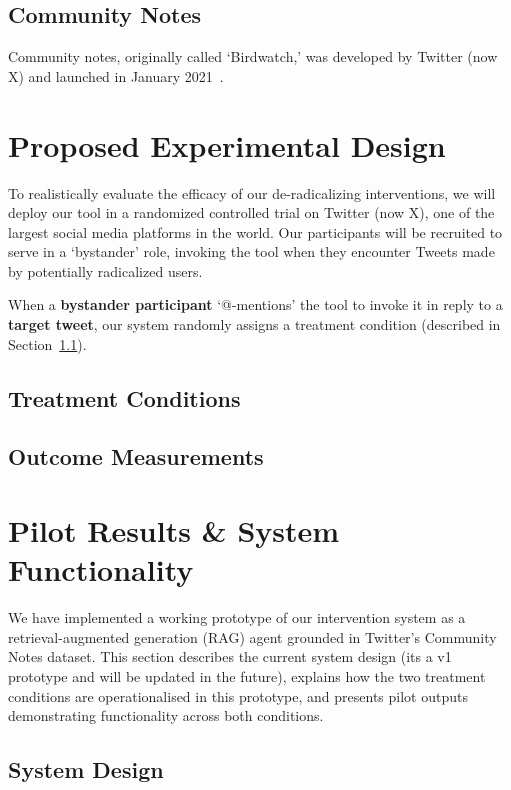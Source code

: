 \documentclass{article}
\begin{document}
\subsection{Community Notes}\label{sec:comm_notes}
Community notes, originally called `Birdwatch,' was developed by Twitter (now X) and launched in January 2021~\cite{Wojcik2022BirdwatchCW}.

\section{Proposed Experimental Design}\label{sec:design}
To realistically evaluate the efficacy of our de-radicalizing interventions, we will deploy our tool in a randomized controlled trial on Twitter (now X), one of the largest social media platforms in the world. Our participants will be recruited to serve in a `bystander' role, invoking the tool when they encounter Tweets made by potentially radicalized users.

When a \textbf{bystander participant} `@-mentions' the tool to invoke it in reply to a \textbf{target tweet}, our system randomly assigns a treatment condition (described in Section~\ref{sec:conditions}).

\subsection{Treatment Conditions}\label{sec:conditions}

\subsection{Outcome Measurements}\label{sec:outcomes}



\section{Pilot Results \& System Functionality}\label{sec:demo}

We have implemented a working prototype of our intervention system as a retrieval-augmented generation (RAG) agent grounded in Twitter's Community Notes dataset. This section describes the current system design (its a v1 prototype and will be updated in the future), explains how the two treatment conditions are operationalised in this prototype, and presents pilot outputs demonstrating functionality across both conditions.

\subsection{System Design}\label{sec:design}
\end{document}
